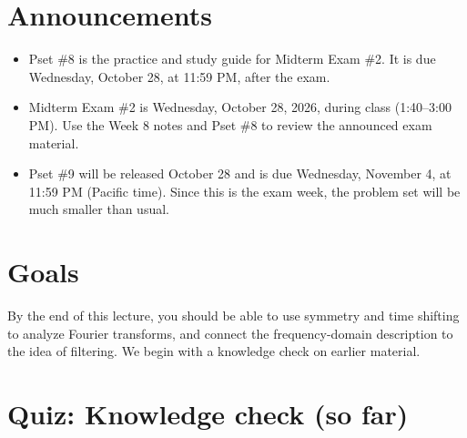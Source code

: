 \section{Announcements}
\begin{itemize}
    \item Pset \#8 is the practice and study guide for Midterm Exam \#2.
    It is due Wednesday, October 28, at 11:59 PM, after the exam.
    \item Midterm Exam \#2 is Wednesday, October 28, 2026, during class
    (1:40--3:00 PM). Use the Week 8 notes and Pset \#8 to review the
    announced exam material.
    \item Pset \#9 will be released October 28 and is due Wednesday,
    November 4, at 11:59 PM (Pacific time). Since this is the exam week, the problem set will be much smaller than usual.
\end{itemize}
\section{Goals}

By the end of this lecture, you should be able to use symmetry and time shifting to analyze Fourier transforms, and connect the frequency-domain description to the idea of filtering. We begin with a knowledge check on earlier material. 
\section{Quiz: Knowledge check (so far)}


